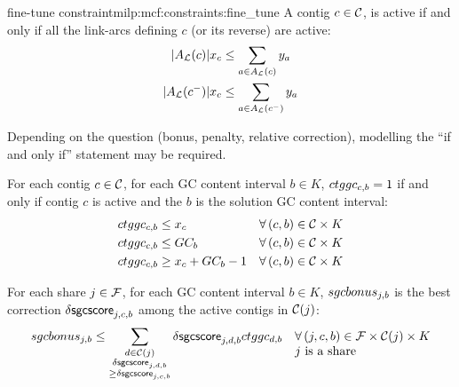 \begin{definition}{\MGC{} fine-tune constraint}{milp:mcf:constraints:fine_tune}
  A contig \(c \in \mathcal{C}{}\), is active if and only if all the link-arcs defining \(c\) (or its reverse) are active:
  \begin{align}
    |A_{\mathcal{L}}{}(c)|x_c & \leq \sum_{a \in A_{\mathcal{L}}{}(c)} y_a \\
    |A_{\mathcal{L}}{}(c^-)|x_c & \leq \sum_{a \in A_{\mathcal{L}}{}(c^-)} y_a
  \end{align}

  \begin{questionbox}
    Depending on the question (bonus, penalty, relative correction), modelling the \enquote{if and only if} statement may be required.
  \end{questionbox}

  For each contig \(c \in \mathcal{C}{}\), for each GC content interval \(b \in K\), \(ctggc_{c,b} = 1\) if and only if contig \(c\) is active and the \(b\) is the solution GC content interval:
  \begin{align}
    \ctggc{c}{b} & \leq x_c & \forall (c, b) \in \Contigs{} \times K \\
    \ctggc{c}{b} & \leq GC_b & \forall (c, b) \in \Contigs{} \times K \\
    \ctggc{c}{b} & \geq x_c + GC_b - 1 & \forall (c, b) \in \Contigs{} \times K
  \end{align}

  For each share \(j \in \mathcal{F}{}\), for each GC content interval \(b \in K\), \(sgcbonus_{j, b}\) is the best correction \(\mathsf{\delta sgcscore}_{j, c, b}\) among the active contigs in \(\mathcal{C}(j)\):
  \begin{equation}
    \sgcbonus{j}{b} \leq \sum_{\substack{
        d \in \Contigs(j) \\ \dsgcscore{j}{d}{b} \\ \geq \dsgcscore{j}{c}{b}
    }} \dsgcscore{j}{d}{b} \ctggc{d}{b} \quad
    \begin{array}[t]{@{}l@{}}
      \forall (j, c, b) \in \Fragments{} \times \Contigs{}(j) \times K \\
      j \text{ is a share}
    \end{array}
  \end{equation}

\end{definition}

